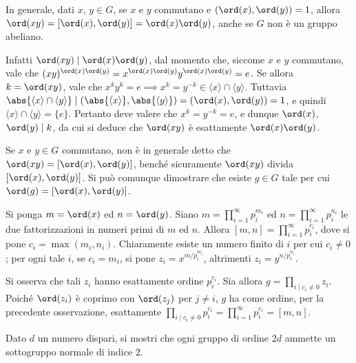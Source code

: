 \documentclass[11pt]{scrartcl}
\begin{document}
	\begin{remark}
		In generale, dati $x$, $y\in G$, se $x$ e $y$ commutano e $(\ord(x),\ord(y)) = 1$, allora 
		$\ord(xy) = [\ord(x), \ord(y)] = \ord(x) \ord(y)$, anche se $G$ non è un gruppo abeliano. \medskip
		
		Infatti $\ord(xy) \mid \ord(x) \ord(y)$, dal momento
		che, siccome $x$ e $y$ commutano, vale che $(xy)^{\ord(x) \ord(y)} = x^{\ord(x) \ord(y)} y^{\ord(x) \ord(y)} = e$.
		Se allora $k = \ord(xy)$, vale che
		$x^k y^k = e \implies x^k = y^{-k} \in \langle x \rangle \cap \langle y \rangle$.
		Tuttavia $\abs{\langle x \rangle \cap \langle y \rangle} \mid
		(\abs{\langle x \rangle}, \abs{\langle y \rangle}) = (\ord(x), \ord(y)) =
		1$, e quindi $\langle x \rangle \cap \langle y \rangle = \{e\}$. Pertanto
		deve valere che $x^k = y^{-k} = e$, e dunque
		$\ord(x)$, $\ord(y) \mid k$, da cui si deduce che
		$\ord(xy)$ è esattamente $\ord(x) \ord(y)$.
	\end{remark}
	
	\begin{remark}
		Se $x$ e $y \in G$ commutano, non è in generale detto che
		$\ord(xy) = [\ord(x), \ord(y)]$, benché sicuramente
		$\ord(xy)$ divida $[\ord(x), \ord(y)]$. Si può comunque dimostrare che esiste
		$g \in G$ tale per cui $\ord(g) = [\ord(x), \ord(y)]$. \medskip
		
		Si ponga $m = \ord(x)$ ed $n = \ord(y)$. Siano $m = \prod_{i = 1}^\infty p_i^{m_i}$
		ed $n = \prod_{i = 1}^\infty p_i^{n_i}$ le due fattorizzazioni in numeri primi
		di $m$ ed $n$. Allora $[m, n] = \prod_{i = 1}^\infty p_i^{c_i}$,
		dove si pone $c_i = \max(m_i, n_i)$. Chiaramente esiste un numero finito di
		$i$ per cui $c_i \neq 0$; per ogni tale $i$, se $c_i = m_i$, si pone
		$z_i = x^{m /p_i^{m_i}}$, altrimenti
		$z_i = y^{n / p_i^{n_i}}$. \medskip
		
		
		Si osserva che tali $z_i$ hanno esattamente ordine $p_i^{c_i}$.
		Sia allora $g = \prod_{i \mid c_i \neq 0} z_i$. Poiché $\ord(z_i)$ è coprimo
		con $\ord(z_j)$ per $j \neq i$, $g$ ha come ordine, per la precedente osservazione,
		esattamente $\prod_{i \mid c_i \neq 0} p_i^{c_i} = \prod_{i = 1}^\infty p_i^{c_i} =
		[m, n]$.
	\end{remark}
	
	\begin{exercise}
		\label{ex1.48}
		Dato $d$ un numero dispari, si mostri che ogni gruppo di ordine $2d$ ammette
		un sottogruppo normale di indice $2$.
	\end{exercise}
	
\end{document}
